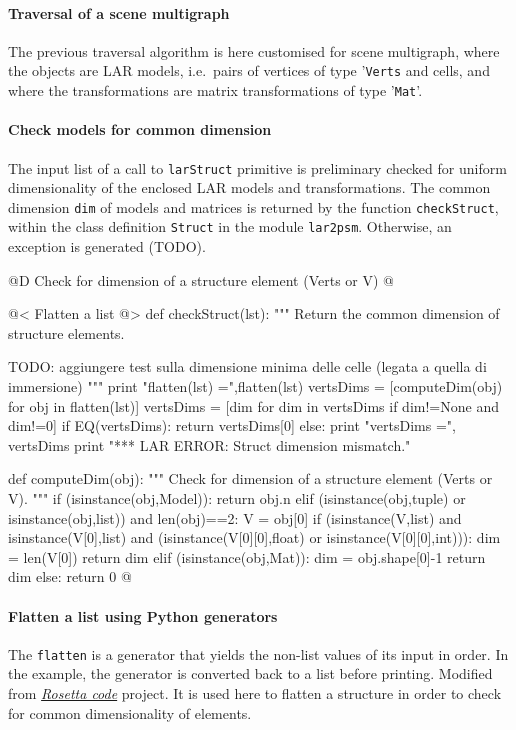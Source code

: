 \documentclass[11pt,oneside]{article}    %
\begin{document}
\paragraph{Traversal of a scene multigraph}

The previous traversal algorithm is here customised for scene multigraph, where the objects are LAR models, i.e.~pairs of vertices of type '\texttt{Verts} and cells, and where the transformations are matrix transformations of type '\texttt{Mat}'.

\paragraph{Check models for common dimension}
The input list of a call to \texttt{larStruct} primitive is preliminary checked for uniform dimensionality of the enclosed LAR models and transformations. The common dimension \texttt{dim} of models and matrices is returned by the function \texttt{checkStruct}, within the class definition \texttt{Struct} in the module \texttt{lar2psm}. Otherwise, an exception is generated (TODO).


@D Check for dimension of a structure element (Verts or V)
@{@< Flatten a list @>
def checkStruct(lst):
    """ Return the common dimension of structure elements.

        TODO: aggiungere test sulla dimensione minima delle celle (legata a quella di immersione)
    """
    print "flatten(lst) =",flatten(lst)
    vertsDims = [computeDim(obj) for obj in flatten(lst)]
    vertsDims = [dim for dim in vertsDims if dim!=None and dim!=0]
    if EQ(vertsDims): 
        return vertsDims[0]
    else: 
        print "\n vertsDims =", vertsDims
        print "*** LAR ERROR: Struct dimension mismatch."

def computeDim(obj):
    """ Check for dimension of a structure element (Verts or V). 
    """
    if (isinstance(obj,Model)):
        return obj.n
    elif (isinstance(obj,tuple) or isinstance(obj,list)) and len(obj)==2:
        V = obj[0]
        if (isinstance(V,list) and isinstance(V[0],list) and 
                (isinstance(V[0][0],float) or isinstance(V[0][0],int))): 
            dim = len(V[0])
            return dim
    elif (isinstance(obj,Mat)):
        dim = obj.shape[0]-1
        return dim
    else: return 0
@}

\paragraph{Flatten a list using Python generators}
The \texttt{flatten} is a generator that yields the non-list values of its input in order. In the example, the generator is converted back to a list before printing. Modified from \href{http://rosettacode.org/wiki/Flatten_a_list#Python}{\emph{Rosetta code}} project. It is used here to flatten a structure in order to check for common dimensionality of elements.
\end{document}

